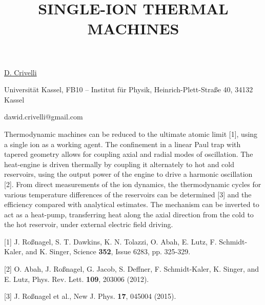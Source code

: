 \title{SINGLE-ION THERMAL MACHINES}

\underline{D. Crivelli} 

{\normalsize{\vspace{-4mm}
Universit{\"a}t Kassel,
FB10 -- Institut f{\"u}r Physik,
Heinrich-Plett-Stra{\ss}e 40,
34132 Kassel

\email dawid.crivelli@gmail.com}}

Thermodynamic machines can be reduced to the ultimate atomic limit [1], using a single ion as a working agent. The confinement in a linear Paul trap with tapered geometry allows for coupling axial and radial modes of oscillation.
The heat-engine is driven thermally by coupling it alternately to hot and cold reservoirs, using the output power of the engine to drive a harmonic oscillation [2].
From direct measurements of the ion dynamics, the thermodynamic cycles for various temperature differences of the reservoirs can be determined [3] and the efficiency compared with analytical estimates.
The mechanism can be inverted to act as a heat-pump, transferring heat along the axial direction from the cold to the hot reservoir, under external electric field driving.

{\normalsize
[1] J. Ro{\ss}nagel, S. T. Dawkins, K. N. Tolazzi, O. Abah, E. Lutz, F. Schmidt-Kaler, and K. Singer, Science \textbf{352}, Issue 6283, pp. 325-329.
\vsp

[2] O. Abah, J. Ro{\ss}nagel, G. Jacob, S. Deffner, F. Schmidt-Kaler, K. Singer, and E. Lutz, Phys. Rev. Lett. \textbf{109}, 203006 (2012).
\vsp

[3] J. Ro{\ss}nagel et al., New J. Phys. \textbf{17}, 045004 (2015).
}



\vspace{\baselineskip} 